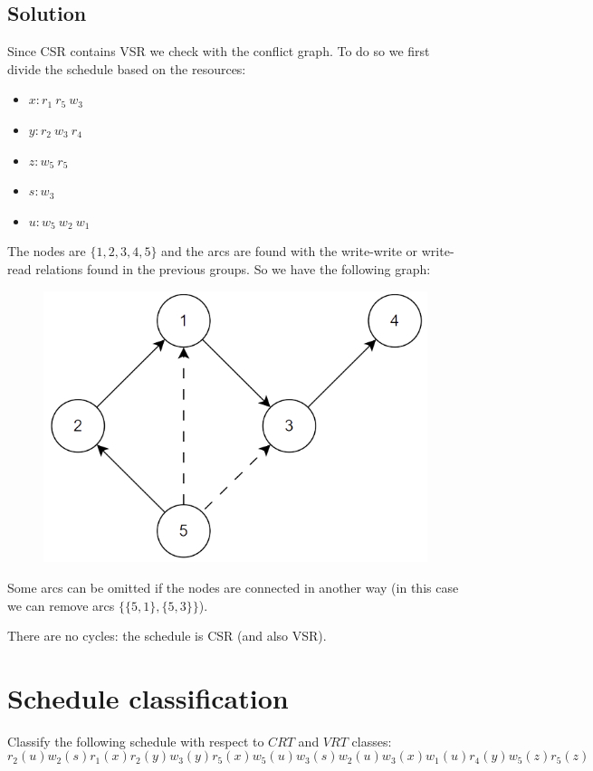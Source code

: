 \documentclass[12pt, a4paper]{report}
\newtheorem[style=M,bodystyle=\normalfont]{theorem}{Theorem}
\newtheorem[style=M,bodystyle=\normalfont]{corollary}{Corollary}
\newtheorem[style=M,bodystyle=\normalfont]{lemma}{Lemma}
\newtheorem[style=M,bodystyle=\normalfont]{definition}{Definition}
\begin{document}
    \subsection*{Solution}
        Since CSR contains VSR we check with the conflict graph. To do so we first divide the schedule based on the resources: 
        \begin{itemize}
            \item $x: r_1 \: r_5 \:w_3$
            \item $y: r_2 \: w_3 \:r_4$
            \item $z: w_5 \: r_5$
            \item $s: w_3$
            \item $u: w_5 \: w_2 \:w_1$
        \end{itemize}
        The nodes are $\{1,2,3,4,5\}$ and the arcs are found with the write-write or write-read relations found in the previous groups. So we have the following graph:
        \begin{figure}[H]
            \centering
            \includegraphics[width=0.5\linewidth]{images/conflictgraph.png}
        \end{figure}
        Some arcs can be omitted if the nodes are connected in another way (in this case we can remove arcs $\{\{5,1\},\{5,3\}\}$). 

        There are no cycles: the schedule is CSR (and also VSR). 

    \newpage
    
    \section{Schedule classification}
        Classify the following schedule with respect to $CRT$ and $VRT$ classes: 
        \[r_2(u) w_2(s) r_1(x) r_2(y) w_3(y) r_5(x) w_5(u) w_3(s)w_2(u) w_3(x) w_1(u) r_4(y) w_5(z) r_5(z)\]
\end{document}
